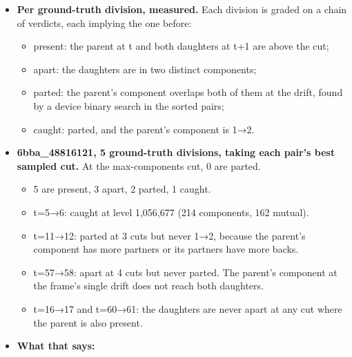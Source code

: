 \begin{itemize}
\begin{itemize}
\begin{itemize}
\item 6bba\_\allowbreak{}48816121: 6,688 moves, 570 1→2, 590 2→1, 42,853 disappear, 40,996 appear, out of 61,679 components. The ground truth holds 5 divisions over these pairs.
\item 44b6\_\allowbreak{}0113de3b: 7,962 moves, 819 1→2, 789 2→1, 22,545 disappear, 21,517 appear, out of 39,507. The ground truth holds 0 divisions.
\item So at max-components cut, about 70\% of the components have no partner at the drift: specks that do not persist. Higher in the tree about 20\% do.
\item The ground truth annotates about 9 cells a frame. Census totals cannot be graded against it. Only a per-division verdict can.
\end{itemize}
\item \textbf{Per ground-truth division, measured.} Each division is graded on a chain of verdicts, each implying the one before:

\begin{itemize}
\item present: the parent at t and both daughters at t+1 are above the cut;
\item apart: the daughters are in two distinct components;
\item parted: the parent's component overlaps both of them at the drift, found by a device binary search in the sorted pairs;
\item caught: parted, and the parent's component is 1→2.
\end{itemize}
\item \textbf{6bba\_\allowbreak{}48816121, 5 ground-truth divisions, taking each pair's best sampled cut.} At the max-components cut, 0 are parted.

\begin{itemize}
\item 5 are present, 3 apart, 2 parted, 1 caught.
\item t=5→6: caught at level 1,056,677 (214 components, 162 mutual).
\item t=11→12: parted at 3 cuts but never 1→2, because the parent's component has more partners or its partners have more backs.
\item t=57→58: apart at 4 cuts but never parted. The parent's component at the frame's single drift does not reach both daughters.
\item t=16→17 and t=60→61: the daughters are never apart at any cut where the parent is also present.
\end{itemize}
\item \textbf{What that says:}


\end{itemize}
\end{itemize}
